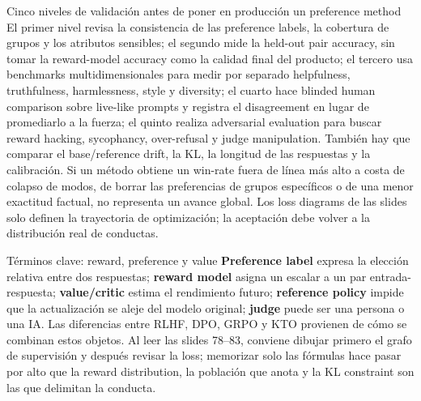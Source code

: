 \begin{warningbox}{Cinco niveles de validación antes de poner en producción un preference method}
El primer nivel revisa la consistencia de las preference labels, la cobertura de grupos y los atributos sensibles; el segundo mide la held-out pair accuracy, sin tomar la reward-model accuracy como la calidad final del producto; el tercero usa benchmarks multidimensionales para medir por separado helpfulness, truthfulness, harmlessness, style y diversity; el cuarto hace blinded human comparison sobre live-like prompts y registra el disagreement en lugar de promediarlo a la fuerza; el quinto realiza adversarial evaluation para buscar reward hacking, sycophancy, over-refusal y judge manipulation. También hay que comparar el base/reference drift, la KL, la longitud de las respuestas y la calibración. Si un método obtiene un win-rate fuera de línea más alto a costa de colapso de modos, de borrar las preferencias de grupos específicos o de una menor exactitud factual, no representa un avance global. Los loss diagrams de las slides solo definen la trayectoria de optimización; la aceptación debe volver a la distribución real de conductas.
\end{warningbox}

\begin{knowledgebox}{Términos clave: reward, preference y value}
\textbf{Preference label} expresa la elección relativa entre dos respuestas; \textbf{reward model} asigna un escalar a un par entrada-respuesta; \textbf{value/critic} estima el rendimiento futuro; \textbf{reference policy} impide que la actualización se aleje del modelo original; \textbf{judge} puede ser una persona o una IA. Las diferencias entre RLHF, DPO, GRPO y KTO provienen de cómo se combinan estos objetos. Al leer las slides 78--83, conviene dibujar primero el grafo de supervisión y después revisar la loss; memorizar solo las fórmulas hace pasar por alto que la reward distribution, la población que anota y la KL constraint son las que delimitan la conducta.
\end{knowledgebox}


